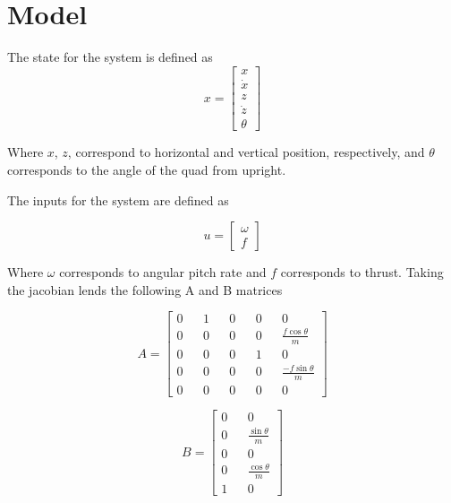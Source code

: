 \documentclass[12pt]{article}
\begin{document}
\section{Model}

The state for the system is defined as
\begin{equation}
\label{state}
x = \begin{bmatrix} x\\ \dot{x} \\ z \\ \dot{z} \\ \theta \end{bmatrix}
\end{equation}

Where $x$, $z$, correspond to horizontal and vertical position, respectively, and $\theta$ corresponds to the angle of the quad from upright.

The inputs for the system are defined as

\begin{equation}
\label{inputs}
u = \begin{bmatrix} \omega \\ f \end{bmatrix}
\end{equation}

Where $\omega$ corresponds to angular pitch rate and $f$ corresponds to thrust.
Taking the jacobian lends the following A and B matrices

\begin{equation}
\label{A_matrix}
A = \begin{bmatrix} 0 && 1 && 0 && 0 && 0 \\ 0 && 0 && 0 && 0 && \frac{f\cos{\theta}}{m} \\  0 && 0 && 0 && 1 && 0 \\ 0 && 0 && 0 && 0 && \frac{-f\sin{\theta}}{m} \\ 0 && 0 && 0 && 0 && 0 \end{bmatrix}
\end{equation}

\begin{equation}
\label{B_matrix}
B = \begin{bmatrix} 0 && 0 \\ 0 && \frac{\sin{\theta}}{m} \\ 0 && 0 \\ 0 && \frac{\cos{\theta}}{m} \\ 1 && 0 \end{bmatrix}
\end{equation}
\end{document}
